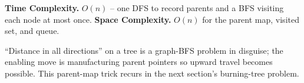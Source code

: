 \begin{complexitybox}
\textbf{Time Complexity.} $O(n)$ -- one DFS to record parents and a BFS
visiting each node at most once. \textbf{Space Complexity.} $O(n)$ for the
parent map, visited set, and queue.
\end{complexitybox}

\begin{takeawaybox}
``Distance in all directions'' on a tree is a graph-BFS problem in
disguise; the enabling move is manufacturing parent pointers so upward
travel becomes possible. This parent-map trick recurs in the next section's
burning-tree problem.
\end{takeawaybox}
